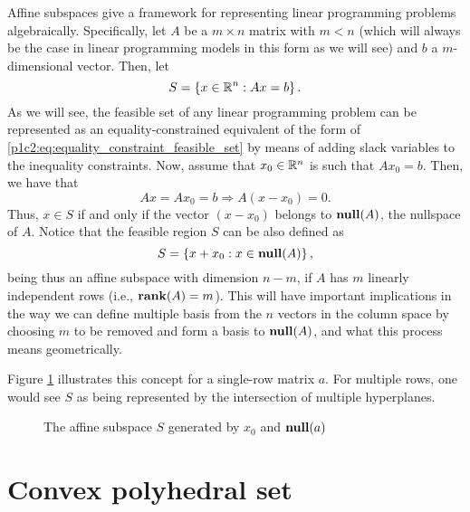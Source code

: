 Affine subspaces give a framework for representing linear programming problems algebraically. Specifically, let $A$ be a $m \times n$ matrix with $m < n$ (which will always be the case in linear programming models in this form as we will see) and $b$ a $m$-dimensional vector. Then, let 
%
\begin{equation} \label{p1c2:eq:equality_constraint_feasible_set}
	S = \left\{ x \in \mathbb{R}^n : Ax = b \right \}.		
\end{equation}
%
As we will see, the feasible set of any linear programming problem can be represented as an equality-constrained equivalent of the form of \eqref{p1c2:eq:equality_constraint_feasible_set} by means of adding slack variables to the inequality constraints. Now, assume that $x_0 \in \mathbb{R}^n$ is such that $Ax_0 = b$.  Then, we have that 
%
\begin{equation*}
	Ax = Ax_0 = b \Rightarrow A(x - x_0) = 0.	
\end{equation*}
%
Thus, $x \in S$ if and only if the vector $(x - x_0)$ belongs to $\mathop{\bf null}(A)$, the nullspace of $A$. Notice that the feasible region $S$ can be also defined as 
%
\begin{equation*}
	S = \left\{ x + x_0 : x \in \mathop{\bf null}(A) \right \},	
\end{equation*}
%
being thus an affine subspace with dimension $n-m$, if $A$ has $m$ linearly independent rows (i.e., $\mathop{\bf rank}(A)=m$). This will have important implications in the way we can define multiple basis from the $n$ vectors in the column space by choosing $m$ to be removed and form a basis to $\mathop{\bf null}(A)$, and what this process means geometrically.

Figure \ref{p1c2:fig:nill_space_a} illustrates this concept for a single-row matrix $a$. For multiple rows, one would see $S$ as being represented by the intersection of multiple hyperplanes.

\begin{figure}
	\caption{The affine subspace $S$ generated by $x_0$ and $\mathop{\bf null}(a)$} \label{p1c2:fig:nill_space_a}		
\end{figure}


\section{Convex polyhedral set}

